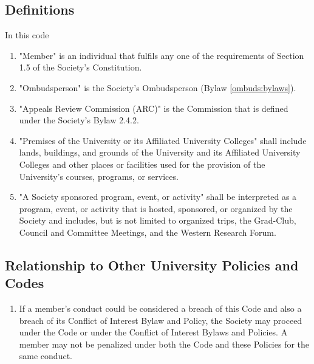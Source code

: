 \subsection{Definitions}
In this code
\begin{enumerate} [align=left]
\item "Member" is an individual that fulfils any one of the requirements of Section 1.5 of the Society's Constitution.
\item "Ombudsperson" is the Society's Ombudsperson (Bylaw \ref{ombuds:bylaws}).
\item "Appeals Review Commission (ARC)" is the Commission that is defined under the Society's Bylaw 2.4.2.
\item "Premises of the University or its Affiliated University Colleges" shall include lands, buildings, and grounds of the University and its Affiliated University Colleges and other places or facilities used for the provision of the University's courses, programs, or services.
\item "A Society sponsored program, event, or activity" shall be interpreted as a program, event, or activity that is hosted, sponsored, or organized by the Society and includes, but is not limited to organized trips, the Grad-Club, Council and Committee Meetings, and the Western Research Forum.
\end{enumerate}

\subsection{Relationship to Other University Policies and Codes}
\begin{enumerate} [align=left]
\item If a member's conduct could be considered a breach of this Code and also a breach of its Conflict of Interest Bylaw and Policy, the Society may proceed under the Code or under the Conflict of Interest Bylaws and Policies. A member may not be penalized under both the Code and these Policies for the same conduct.
\end{enumerate}

